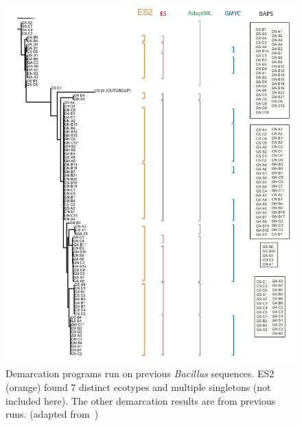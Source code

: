 \begin{figure}[h!]
  \centering
    \includegraphics[scale=0.4]{images/Bacillus-CH4}
      \caption[Demarcation programs run on previous \emph{Bacillus} sequences.]{Demarcation programs run on previous \emph{Bacillus} sequences. ES2 (orange) found 7 distinct ecotypes and multiple singletons (not included here). The other demarcation results are from previous runs. (adapted from~\protect\cite{carlo})}
    \label{fig:Bacillus}
\end{figure}

